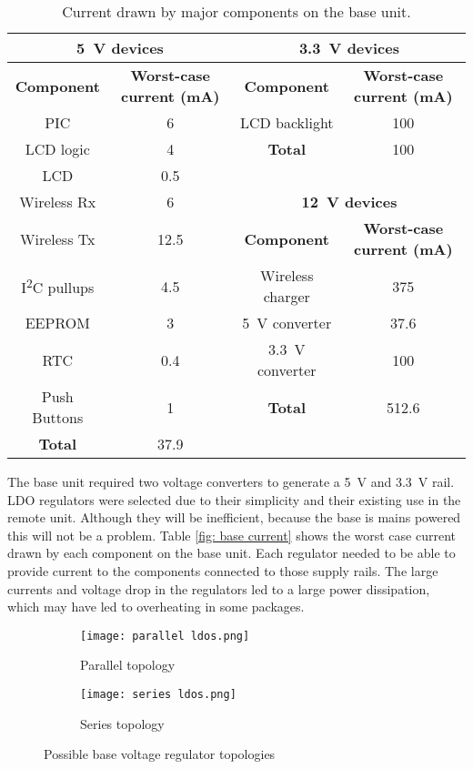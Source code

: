 \begin{table}[htbp]
	\begin{center}
	\begin{tabular}{|c|c|c|c|}
	\hline
	\multicolumn{2}{|c}{\textbf{\SI{5}{\volt} devices}} & \multicolumn{2}{|c|}{\textbf{\SI{3.3}{\volt} devices}}\\
	\hline
	\textbf{Component} & \textbf{Worst-case current (\si{\milli\ampere})} & \textbf{Component} & \textbf{Worst-case current (\si{\milli\ampere})} \\
	\hline
	PIC & 6 & LCD backlight & 100 \\
	\cline{3-4}
	LCD logic & 4 & \textbf{Total} & 100\\
	\cline{3-4}
	LCD & 0.5 & \multicolumn{2}{c}{} \\
	\cline{3-4}
	Wireless Rx & 6 &  \multicolumn{2}{c|}{\textbf{\SI{12}{\volt} devices}} \\
	\cline{3-4}
	Wireless Tx & 12.5 & \textbf{Component} & \textbf{Worst-case current (\si{\milli\ampere})}  \\
	\cline{3-4}
	I\textsuperscript{2}C pullups & 4.5 & Wireless charger & 375 \\
	EEPROM & 3 & \SI{5}{\volt} converter & 37.6 \\
	RTC & 0.4 & \SI{3.3}{\volt} converter & 100 \\
	\cline{3-4}
	Push Buttons & 1 & \textbf{Total} & 512.6  \\
	\hline
	\textbf{Total} & 37.9  \\
	\cline{1-2}
	\end{tabular}
	\caption{Current drawn by major components on the base unit.}
	\label{tab: base current}
	\end{center}
\end{table}

The base unit required two voltage converters to generate a \SI{5}{\volt} and \SI{3.3}{\volt} rail. LDO regulators were selected due to their simplicity and their existing use in the remote unit. Although they will be inefficient, because the base is mains powered this will not be a problem. Table \ref{fig: base current} shows the worst case current drawn by each component on the base unit. Each regulator needed to be able to provide current to the components connected to those supply rails. The large currents and voltage drop in the regulators led to a large power dissipation, which may have led to overheating in some packages.\\

\begin{figure}[htbp]
	\centering
	\begin{subfigure}[b]{0.35\linewidth}
		\texttt{[image: parallel ldos.png]}
		\caption{Parallel topology}
		\label{fig: parallel ldos}
	\end{subfigure}
	\begin{subfigure}[b]{0.5\linewidth}
		\texttt{[image: series ldos.png]}
		\caption{Series topology}
		\label{fig: series ldos}
	\end{subfigure}
	\caption{Possible base voltage regulator topologies}
	\label{fig: base ldos}
\end{figure}

